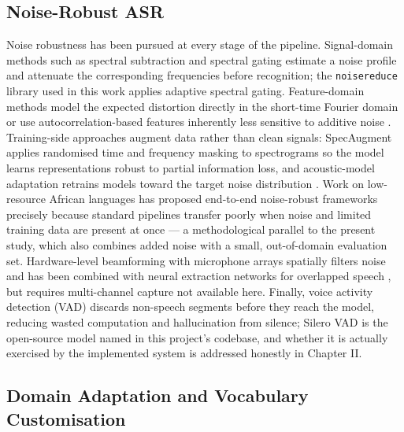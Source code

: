 \documentclass[12pt]{report}
\begin{document}
\subsection{Noise-Robust ASR}

Noise robustness has been pursued at every stage of the pipeline. Signal-domain methods such as spectral subtraction and spectral gating estimate a noise profile and attenuate the corresponding frequencies before recognition; the \texttt{noisereduce} library used in this work applies adaptive spectral gating. Feature-domain methods model the expected distortion directly in the short-time Fourier domain \cite{astudillo2013computing} or use autocorrelation-based features inherently less sensitive to additive noise \cite{farahani2017autocorrelation}. Training-side approaches augment data rather than clean signals: SpecAugment \cite{park2019specaugment} applies randomised time and frequency masking to spectrograms so the model learns representations robust to partial information loss, and acoustic-model adaptation retrains models toward the target noise distribution \cite{li2014overview,bhardwaj2021usage}. Work on low-resource African languages has proposed end-to-end noise-robust frameworks precisely because standard pipelines transfer poorly when noise and limited training data are present at once \cite{ejigu2025noise} --- a methodological parallel to the present study, which also combines added noise with a small, out-of-domain evaluation set. Hardware-level beamforming with microphone arrays spatially filters noise and has been combined with neural extraction networks for overlapped speech \cite{chen2018multi}, but requires multi-channel capture not available here. Finally, voice activity detection (VAD) discards non-speech segments before they reach the model, reducing wasted computation and hallucination from silence; Silero VAD is the open-source model named in this project's codebase, and whether it is actually exercised by the implemented system is addressed honestly in Chapter II.

\subsection{Domain Adaptation and Vocabulary Customisation}
\end{document}
